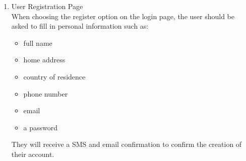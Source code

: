\documentclass[10pt]{article}
\begin{document}
\begin{enumerate}
  \item {User Registration Page} \\
  When choosing the register option on the login page, the user should be asked to fill in personal information such as:
  \begin{itemize}
    \item full name
  
    \item home address
  
    \item country of residence
  
    \item phone number
  
    \item email
  
    \item a password
  
  \end{itemize}

  They will receive a SMS and email confirmation to confirm the creation of their account.
  

\end{enumerate}
\end{document}
